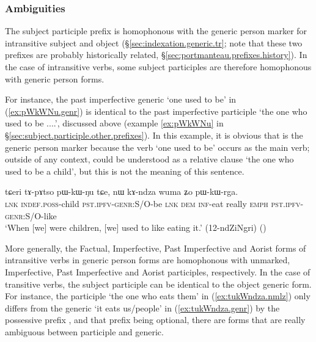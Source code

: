\subsubsection{Ambiguities}  \label{sec:subject.participle.ambiguities}
The subject participle  prefix is homophonous with the generic person marker for intransitive subject and object (§\ref{sec:indexation.generic.tr}; note that these two prefixes are probably historically related, §\ref{sec:portmanteau.prefixes.history}). In the case of intransitive verbs, some subject participles are therefore homophonous with generic person forms. 

For instance, the past imperfective generic  `one used to be' in (\ref{ex:pWkWNu.genr}) is identical to the past imperfective participle  `the one who used to be ....', discussed above (example \ref{ex:pWkWNu} in §\ref{sec:subject.participle.other.prefixes}). In this example, it is obvious that  is the generic person marker because the verb  `one used to be' occurs as the main verb; outside of any context,   could be understood as a relative clause `the one who used to be a child', but this is not the meaning of this sentence. 

\begin{exe}
\ex \label{ex:pWkWNu.genr}
 \gll tɕeri tɤ-pɤtso pɯ-kɯ-ŋu tɕe, nɯ kɤ-ndza wuma ʑo pɯ-kɯ-rga. \\
 \textsc{lnk} \textsc{indef}.\textsc{poss}-child \textsc{pst}.\textsc{ipfv}-\textsc{genr}:S/O-be \textsc{lnk} \textsc{dem} \textsc{inf}-eat really \textsc{emph} \textsc{pst}.\textsc{ipfv}-\textsc{genr}:S/O-like \\
 \glt `When [we] were children, [we] used to like eating it.' (12-ndZiNgri) ()
\end{exe}

More generally, the Factual, Imperfective, Past Imperfective and Aorist forms of intransitive verbs in generic person forms are homophonous with unmarked, Imperfective, Past Imperfective and Aorist participles, respectively. In the case of transitive verbs, the subject participle can be identical to the object generic form. For instance, the participle  `the one who eats them' in (\ref{ex:tukWndza.nmlz}) only differs from the generic  `it eats us/people' in  (\ref{ex:tukWndza.genr}) by the possessive prefix , and that prefix being optional, there are forms that are really ambiguous between participle and generic. 


